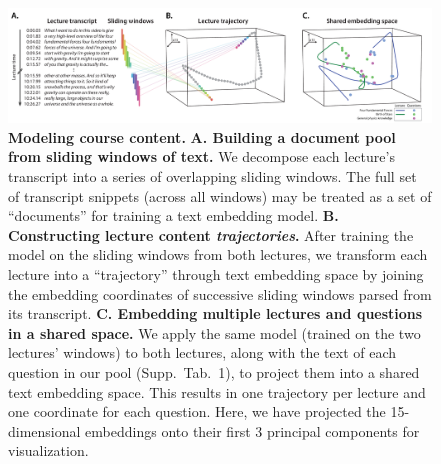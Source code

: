 \documentclass[10pt]{article}
\newcommand{\questions}{1}
\begin{document}
\begin{figure}[tp]
    \centering
    \includegraphics[width=\textwidth]{figs/sliding_windows}

    \caption{\textbf{Modeling course content.} \textbf{A. Building a document
    pool from sliding windows of text.} We decompose each lecture's transcript
    into a series of overlapping sliding windows. The full set of transcript
    snippets (across all windows) may be treated as a set of ``documents'' for
    training a text embedding model. \textbf{B. Constructing lecture content
    \textit{trajectories}.} After training the model on the sliding windows
    from both lectures, we transform each lecture into a ``trajectory'' through
    text embedding space by joining the embedding coordinates of successive
    sliding windows parsed from its transcript. \textbf{C. Embedding multiple
    lectures and questions in a shared space.} We apply the same model (trained
    on the two lectures' windows) to both lectures, along with the text of each
    question in our pool (Supp.~Tab.~\questions), to project them into a shared
    text embedding space. This results in one trajectory per lecture and one
    coordinate for each question. Here, we have projected the 15-dimensional
    embeddings onto their first 3 principal components for visualization.}

    \label{fig:sliding-windows}
\end{figure}
\end{document}
